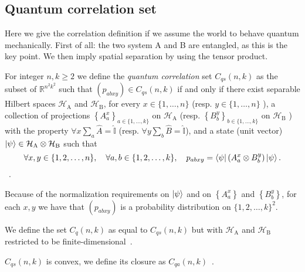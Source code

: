 \subsection{Quantum correlation set}
Here we give the correlation definition if we assume the world to behave quantum mechanically. First of all: the two system A and B are entangled, as this is the key point. We then imply spatial separation by using the tensor product.


\begin{defn}\label{defn:quantum-correlation-set}
    For integer $n, k \geq 2$ we define the \emph{quantum correlation} set $C_{q s}(n, k)$ as the subset of $\mathbb{R}^{n^{2} k^{2}}$ such that $\left(p_{a b x y}\right) \in C_{q s}(n, k)$ if and only if there exist separable Hilbert spaces $\mathcal{H}_{\mathrm{A}}$ and $\mathcal{H}_{\mathrm{B}}$, for every $x \in\{1, \ldots, n\}$ (resp. $y \in\{1, \ldots, n\}$ ), a collection of projections $\left\{A_{a}^{x}\right\}_{a \in\{1, \ldots, k\}}$ on $\mathcal{H}_{\mathrm{A}}$ (resp. $\left\{B_{b}^{y}\right\}_{b \in\{1, \ldots, k\}}$ on $\mathcal{H}_{\mathrm{B}}$ ) with the property $\forall x \sum_a{\hat{A}} = \hat{\mathbb{I}}$ (resp. $\forall y \sum_b{\hat{B}} = \hat{\mathbb{I}}$), and a state (unit vector) $\ket{\psi} \in \mathcal{H}_{\mathrm{A}} \otimes \mathcal{H}_{\mathrm{B}}$ such that
    \begin{equation}
    \forall x, y \in\{1,2, \ldots, n\}, \quad \forall a, b \in\{1,2, \ldots, k\}, \quad p_{a b x y}=\bra{\psi}\left(A_{a}^{x} \otimes B_{b}^{y}\right) \ket{\psi} .
    \end{equation}~\cite{mipre}.
\end{defn}

Because of the normalization requirements on $\ket{\psi}$ and on $\left\{A_{a}^{x}\right\}$ and $\left\{B_{b}^{y}\right\}$, for each $x, y$ we have that $\left(p_{a b x y}\right)$ is a probability distribution on $\{1,2, \ldots, k\}^{2}$.

\begin{defn}
We define the set $C_{q}(n, k)$ as equal to $C_{q s}(n, k)$ but with $\mathcal{H}_{\mathrm{A}}$ and $\mathcal{H}_{\mathrm{B}}$ restricted to be finite-dimensional~\cite{mipre}.
\end{defn}

\begin{defn}
    $C_{q s}(n, k)$ is convex, we define its closure as $C_{q a}(n, k)$~\cite{mipre}.
\end{defn}
